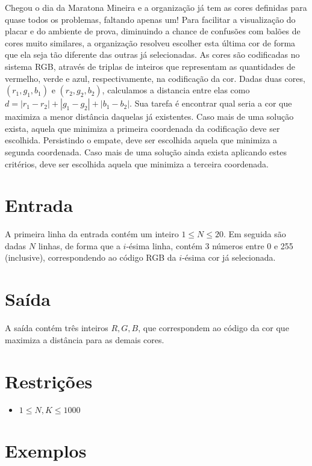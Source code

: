 Chegou o dia da Maratona Mineira e a organização já tem as cores definidas para quase todos os problemas, faltando apenas um!
Para facilitar a visualização do placar e do ambiente de prova, diminuindo a chance de confusões com balões de cores muito similares,
a organização resolveu escolher esta última cor de forma que ela seja tão diferente das outras já selecionadas. As cores são codificadas
no sistema RGB, através de triplas de inteiros que representam as quantidades de vermelho, verde e azul, respectivamente,
na codificação da cor. Dadas duas cores, $(r_1,g_1,b_1)$ e $(r_2,g_2,b_2)$, calculamos a distancia entre elas como $d = |r_1-r_2| + |g_1-g_2| + |b_1-b_2|$.
Sua tarefa é encontrar qual seria a cor que maximiza a menor distância daquelas já existentes. Caso mais de uma solução exista,
aquela que minimiza a primeira coordenada da codificação deve ser escolhida. Persistindo o empate, deve ser escolhida aquela que minimiza
a segunda coordenada. Caso mais de uma solução ainda exista aplicando estes critérios, deve ser escolhida aquela que minimiza a terceira coordenada.

\section*{Entrada}

A primeira linha da entrada contém um inteiro $1 \leq N \leq 20$. Em seguida são dadas $N$ linhas, de forma que a $i$-ésima linha, contém 3 números
entre 0 e 255 (inclusive), correspondendo ao código RGB da $i$-ésima cor já selecionada.

\section*{Saída}

A saída contém três inteiros $R, G, B$, que correspondem ao código da cor que maximiza a distância para as demais cores.

\section*{Restrições}

\begin{itemize}
\item $1 \leq N,K \leq 1000$
\end{itemize}


\section*{Exemplos}

\exemplo
